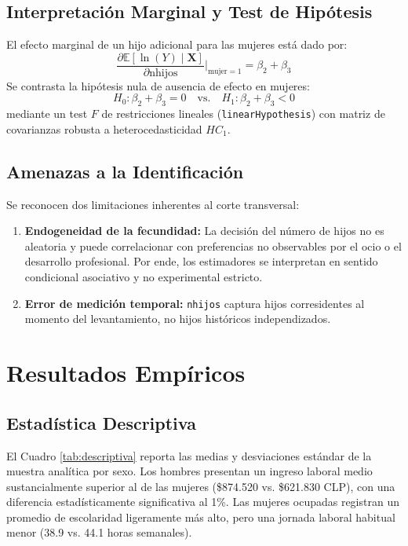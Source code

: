 \documentclass[11pt,a4paper]{article}
\begin{document}
\subsection{Interpretación Marginal y Test de Hipótesis}
El efecto marginal de un hijo adicional para las mujeres está dado por:
\begin{equation}
    \frac{\partial \mathbb{E}[\ln(Y) \mid \mathbf{X}]}{\partial \text{nhijos}} \Bigg|_{\text{mujer}=1} = \beta_2 + \beta_3
\end{equation}
Se contrasta la hipótesis nula de ausencia de efecto en mujeres:
\begin{equation*}
    H_0: \beta_2 + \beta_3 = 0 \quad \text{vs.} \quad H_1: \beta_2 + \beta_3 < 0
\end{equation*}
mediante un test $F$ de restricciones lineales (\texttt{linearHypothesis}) con matriz de covarianzas robusta a heterocedasticidad $HC_1$.

\subsection{Amenazas a la Identificación}
Se reconocen dos limitaciones inherentes al corte transversal:
\begin{enumerate}
    \item \textbf{Endogeneidad de la fecundidad:} La decisión del número de hijos no es aleatoria y puede correlacionar con preferencias no observables por el ocio o el desarrollo profesional. Por ende, los estimadores se interpretan en sentido condicional asociativo y no experimental estricto.
    \item \textbf{Error de medición temporal:} \texttt{nhijos} captura hijos corresidentes al momento del levantamiento, no hijos históricos independizados.
\end{enumerate}

\section{Resultados Empíricos}

\subsection{Estadística Descriptiva}
El Cuadro \ref{tab:descriptiva} reporta las medias y desviaciones estándar de la muestra analítica por sexo. Los hombres presentan un ingreso laboral medio sustancialmente superior al de las mujeres (\$874.520 vs. \$621.830 CLP), con una diferencia estadísticamente significativa al 1\%. Las mujeres ocupadas registran un promedio de escolaridad ligeramente más alto, pero una jornada laboral habitual menor (38.9 vs. 44.1 horas semanales).
\end{document}
